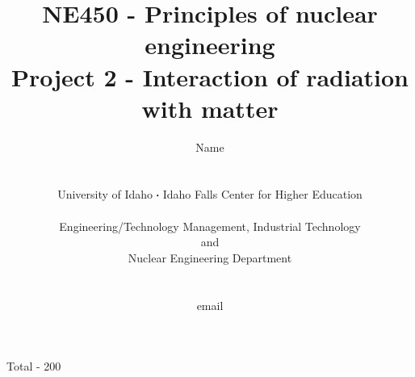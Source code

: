 \documentclass[11pt,a4paper]{article}
\newcommand*\sq{\mathbin{\vcenter{\hbox{\rule{.3ex}{.3ex}}}}} %
\begin{document}
\begin{titlepage}
    \title{
        NE450 - Principles of nuclear engineering\\
        Project 2 - Interaction of radiation with matter\\
    }
    \author{
        Name
        \\ \\ \\
        University of Idaho $\sq$ Idaho Falls Center for Higher Education
        \\ \\
        Engineering/Technology Management, Industrial Technology\\and\\Nuclear Engineering Department
        \\ \\ \\
        email 
    }
\clearpage %
\maketitle
\vspace*{\fill}
\begin{flushright}{
        Total - 200
}
\end{flushright}
\thispagestyle{empty} %
\end{titlepage}
\end{document}

